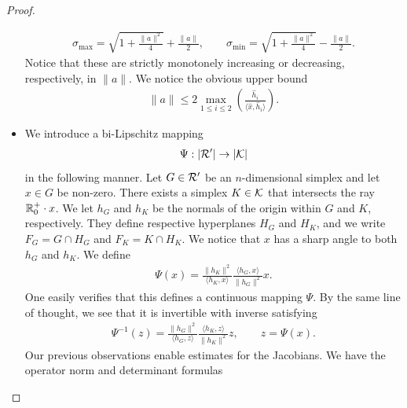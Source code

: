 \documentclass[10pt,a4paper]{article}
\begin{document}
\begin{proof}
\begin{itemize}
        \begin{align*}
            \sigma_{\max} = \sqrt{ 1 + \frac{ \|a\|^{2} }{ 4 } } + \frac{ \|a\| }{2},
            \qquad 
            \sigma_{\min} = \sqrt{ 1 + \frac{ \|a\|^{2} }{ 4 } } - \frac{ \|a\| }{2}.     
        \end{align*}
        Notice that these are strictly monotonely increasing or decreasing, respectively, in $\|a\|$.
        We notice the obvious upper bound 
        \begin{align*}
            \|a\| 
            \leq 
            2 \max_{1 \leq i \leq 2} 
            \left( 
                \frac{ \hat h_i }{ \langle \hat x, \hat h_i \rangle } 
            \right)
            .
        \end{align*}

        \item 
        We introduce a bi-Lipschitz mapping 
        \begin{align*}
            \Psi : |{\mathcal R}'| \rightarrow |{\mathcal K}|
        \end{align*}
        in the following manner. Let ${G} \in {\mathcal R}'$ be an $n$-dimensional simplex and let $x \in {G}$ be non-zero. There exists a simplex $K \in {\mathcal K}$ that intersects the ray ${\mathbb R}_0^+ \cdot x$. We let $h_{{G}}$ and $h_{K}$ be the normals of the origin within ${G}$ and $K$, respectively. They define respective hyperplanes $H_{G}$ and $H_{K}$,
        and we write $F_{G} = G \cap H_{G}$ and $F_{K} = K \cap H_{K}$. 
        We notice that $x$ has a sharp angle to both $h_{{G}}$ and $h_{K}$. 
        We define 
        \begin{align*}
            \Psi(x) 
            = 
            \frac{ \| h_K \|^{2} }{ \langle h_K, x \rangle }
            \frac{ \langle h_{{G}}, x \rangle }{ \| h_{{G}} \|^{2} }
            x
            .
        \end{align*}
        One easily verifies that this defines a continuous mapping $\Psi$. 
        By the same line of thought, we see that it is invertible with inverse satisfying 
        \begin{align*}
            \Psi^{-1}(z) 
            = 
            \frac{ \| h_{{G}} \|^{2} }{ \langle h_{{G}}, z \rangle }
            \frac{ \langle h_K, z \rangle }{ \| h_K \|^{2} }
            z,
            \qquad 
            z = \Psi(x)
            .
        \end{align*}
        Our previous observations enable estimates for the Jacobians. 
        We have the operator norm and determinant formulas 

\end{itemize}
\end{proof}
\end{document}
